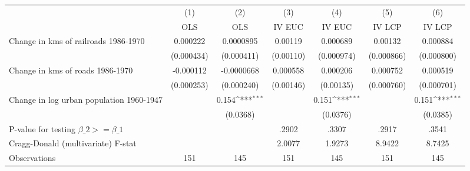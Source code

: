 {
\def\sym#1{\ifmmode^{#1}\else\(^{#1}\)\fi}
\begin{tabular}{l*{6}{c}}
\hline\hline
                &\multicolumn{1}{c}{(1)}&\multicolumn{1}{c}{(2)}&\multicolumn{1}{c}{(3)}&\multicolumn{1}{c}{(4)}&\multicolumn{1}{c}{(5)}&\multicolumn{1}{c}{(6)}\\
                &\multicolumn{1}{c}{OLS}&\multicolumn{1}{c}{OLS}&\multicolumn{1}{c}{IV EUC}&\multicolumn{1}{c}{IV EUC}&\multicolumn{1}{c}{IV LCP}&\multicolumn{1}{c}{IV LCP}\\
\hline
Change in kms of railroads 1986-1970& 0.000222         &0.0000895         &  0.00119         & 0.000689         &  0.00132         & 0.000884         \\
                &(0.000434)         &(0.000411)         &(0.00110)         &(0.000974)         &(0.000866)         &(0.000800)         \\
[1em]
Change in kms of roads 1986-1970&-0.000112         &-0.0000668         & 0.000558         & 0.000206         & 0.000752         & 0.000519         \\
                &(0.000253)         &(0.000240)         &(0.00146)         &(0.00135)         &(0.000760)         &(0.000701)         \\
[1em]
Change in log urban population 1960-1947&                  &    0.154\sym{***}&                  &    0.151\sym{***}&                  &    0.151\sym{***}\\
                &                  & (0.0368)         &                  & (0.0376)         &                  & (0.0385)         \\
\hline
P-value for testing $\beta\_{2} >= \beta\_{1}$&                  &                  &    .2902         &    .3307         &    .2917         &    .3541         \\
Cragg-Donald (multivariate) F-stat&                  &                  &   2.0077         &   1.9273         &   8.9422         &   8.7425         \\
Observations    &      151         &      145         &      151         &      145         &      151         &      145         \\
\hline\hline
\end{tabular}
}
